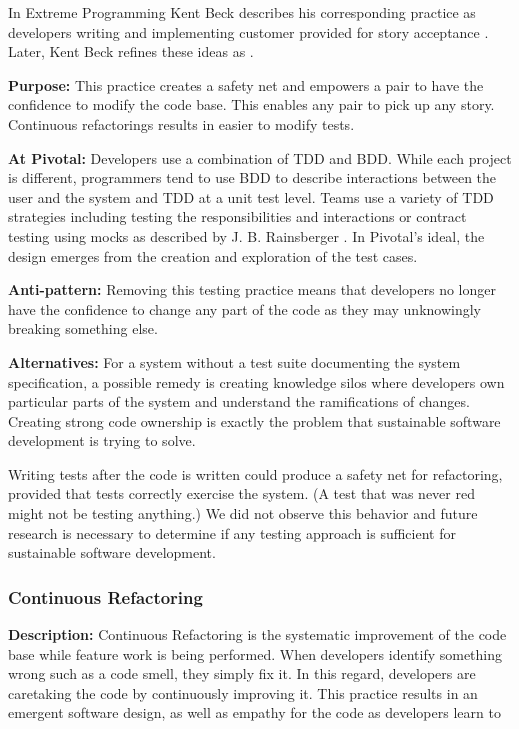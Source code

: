 \begin{table}[]
In Extreme Programming Kent Beck describes his corresponding  practice as developers writing  and implementing customer provided  for story acceptance \cite{ExtremeProgramming2000}. Later, Kent Beck refines these ideas as  \cite{ExtremeProgramming2004}. 

\textbf{Purpose:} This practice creates a safety net and empowers a pair to have the confidence to modify the code base. This enables any pair to pick up any story. Continuous refactorings results in easier to modify tests.

\textbf{At Pivotal:} Developers use a combination of TDD and BDD. While each project is different, programmers tend to use BDD to describe interactions between the user and the system and TDD at a unit test level. Teams use a variety of TDD strategies including testing the responsibilities and interactions \cite{Goose} or contract testing using mocks as described by J. B. Rainsberger \cite{RainsbergerIntegrationTestsYouTube}. In Pivotal's ideal, the design emerges from the creation and exploration of the test cases.  

\textbf{Anti-pattern:} Removing this testing practice means that developers no longer have the confidence to change any part of the code as they may unknowingly breaking something else. 

\textbf{Alternatives:} For a system without a test suite documenting the system specification, a possible remedy is creating knowledge silos where developers own particular parts of the system and understand the ramifications of changes. Creating strong code ownership is exactly the problem that sustainable software development is trying to solve.

Writing tests after the code is written could produce a safety net for refactoring, provided that tests correctly exercise the system. (A test that was never red might not be testing anything.) We did not observe this behavior and future research is necessary to determine if any testing approach is sufficient for sustainable software development.

\subsubsection{Continuous Refactoring}
\textbf{Description:} Continuous Refactoring is the systematic improvement of the code base while feature work is being performed. When developers identify something wrong such as a code smell, they simply fix it. In this regard, developers are caretaking the code by continuously improving it. This practice results in an emergent software design, as well as empathy for the code as developers learn to  


\end{table}
